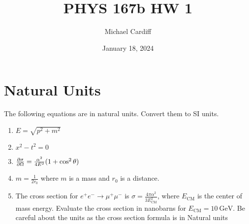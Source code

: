 \documentclass[12pt]{article}
\title{\vspace{-3em}PHYS 167b HW 1}
\author{Michael Cardiff}
\date{January 18, 2024}
\begin{document}
\maketitle

\section{Natural Units}
\begin{problem}
  The following equations are in natural units. Convert them to SI units.
  \begin{enumerate}[label=\alph*)]
  \item $E=\sqrt{p^2+m^2}$
  \item $x^2-t^2=0$
  \item $\pdv{\sigma}{\Omega}=\frac{\alpha^2}{4E^2}(1+\cos^2\theta)$
  \item $m=\frac1{2r_0}$ where $m$ is a mass and $r_0$ is a distance.
  \item The cross section for $e^+e^-\to\mu^+\mu^-$ is $\sigma=\frac{4\pi\alpha^2}{3E_{\text{CM}}^2}$, where $E_{\text{CM}}$ is the center of mass energy. Evaluate the cross section in nanobarns for $E_{\text{CM}}=\SI{10}{\GeV}$. Be careful about the units as the cross section formula is in Natural units
  \end{enumerate}
\end{problem}
\end{document}
